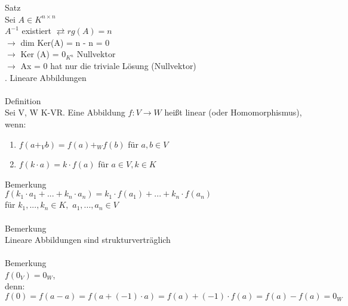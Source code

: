 \documentclass{scrartcl}
\begin{document}
	Satz\\
	Sei $A \in K ^{n \times n}$\\
	$A ^{-1}$ existiert $\rightleftarrows rg(A) = n$\\
	$\rightarrow$ dim Ker(A) = n - n = 0\\
	$\rightarrow$ Ker (A) = $0_{K^n}$ Nullvektor\\
	$\rightarrow$ Ax = 0 hat nur die triviale Lösung (Nullvektor)\\
	. Lineare Abbildungen\\\\
	Definition\\
	Sei V, W K-VR. Eine Abbildung $f: V \rightarrow W$ heißt linear (oder Homomorphismus), wenn:\\
	\begin{enumerate}
		\item
		$f(a+_V b) = f(a) +_W f(b)$ für $a,b \in V$
		\item
		$f(k \cdot a) = k \cdot f(a)$ für $a \in V , k \in K$
	\end{enumerate}
	Bemerkung\\
	$f(k_1 \cdot a_1 + ... + k_n \cdot a_n) = k_1 \cdot f (a_1) + ... + k_n \cdot f(a_n)$\\
	für $k_1 , ... , k_n \in K,$ \hspace{1cm} $a_1 , ... , a_n \in V $\\\\
	Bemerkung\\
	Lineare Abbildungen sind strukturverträglich\\\\
	Bemerkung\\
	$f(0_V) = 0_W$, \\denn: $f(0) = f(a - a) = f(a + (-1) \cdot a) = f(a)+ (-1) \cdot f(a) = f(a) - f(a) = 0_W$
\end{document}
